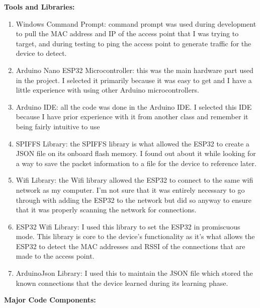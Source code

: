 \documentclass[letterpaper, 11pt]{article}
\newcommand{\secHeader}[1]{\vspace{2mm} \noindent \textbf{#1:}\vspace{-4mm}}
\begin{document}
\secHeader{Tools and Libraries}
\vspace{5mm}
\begin{enumerate}
    \item Windows Command Prompt: command prompt was used during development to pull the MAC address and IP of the access point that I was trying to target, and during testing to 
    ping the access point to generate traffic for the device to detect.
    \item Arduino Nano ESP32 Microcontroller: this was the main hardware part used in the project. I selected it primarily because it was easy to get and I have a little experience with using other 
    Arduino microcontrollers.
    \item Arduino IDE: all the code was done in the Arduino IDE. I selected this IDE because I have prior experience with it from another class and remember it being fairly intuitive to use
    \item SPIFFS Library: the SPIFFS library is what allowed the ESP32 to create a JSON file on its onboard flash memory. I found out about it while looking for a way to save the packet information
    to a file for the device to reference later.
    \item Wifi Library: the Wifi library allowed the ESP32 to connect to the same wifi network as my computer. I'm not sure that it was entirely necessary to go through with adding the ESP32 to the 
    network but did so anyway to ensure that it was properly scanning the network for connections.
    \item ESP32 Wifi Library: I used this library to set the ESP32 in promiscuous mode. This library is core to the device's functionality as it's what allows the ESP32 to detect the 
    MAC addresses and RSSI of the connections that are made to the access point.
    \item ArduinoJson Library: I used this to maintain the JSON file which stored the known connections that the device learned during its learning phase.
\end{enumerate}


\newpage
\secHeader{Major Code Components}
\vspace{5mm}
\end{document}
